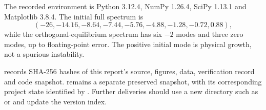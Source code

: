 The recorded environment is Python 3.12.4, NumPy 1.26.4,
SciPy 1.13.1 and Matplotlib 3.8.4. The initial full spectrum is
\[
(-26,-14.16,-8.64,-7.44,-5.76,-4.88,-1.28,-0.72,0.88),
\]
while the orthogonal-equilibrium spectrum has six $-2$ modes and
three zero modes, up to floating-point error. The positive initial
mode is physical growth, not a spurious instability.

 records SHA-256 hashes of this report's
source, figures, data, verification record and code snapshot.
  remains a separate preserved snapshot,
with its corresponding project state identified by .
Further deliveries should use a new directory such as
 or  and update the version index.
